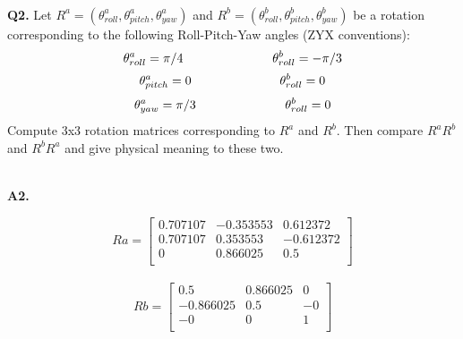 \message{ !name(cmu_airlab_report.tex)}\documentclass{article}
\newcommand\Problem[1]{
  \\
  \textbf{Q#1.}
}
\newcommand\Sol[1]{
  \\
  \textbf{A#1.}
}
\begin{document}
\Problem{2} Let $R^a = (\theta_{roll}^a, \theta_{pitch}^a, \theta_{yaw}^a)$ and $R^b = (\theta_{roll}^b, \theta_{pitch}^b, \theta_{yaw}^b)$ be a rotation corresponding to the following Roll-Pitch-Yaw angles (ZYX conventions):
$$\theta_{roll}^a = \pi/4 \hspace{2.5cm} \theta_{roll}^b = -\pi/3 $$
$$\theta_{pitch}^a = 0 \hspace{2.5cm} \theta_{roll}^b = 0 $$
$$\theta_{yaw}^a = \pi/3 \hspace{2.5cm} \theta_{roll}^b = 0 $$
Compute 3x3 rotation matrices corresponding to $R^a$ and $R^b$. Then compare $R^aR^b$ and $R^bR^a$ and give physical meaning to these two.
\Sol{2}
\[
  Ra =
  \begin{bmatrix}
    0.707107 & -0.353553 & 0.612372\\
 0.707107 & 0.353553 & -0.612372\\
        0 & 0.866025  &     0.5\\
  \end{bmatrix}
\]
\\
\[
  Rb =
  \begin{bmatrix}
          0.5  & 0.866025    &     0\\
-0.866025   &    0.5     &   -0\\
       -0    &     0     &    1\\
  \end{bmatrix}
\]
\\
\end{document}

